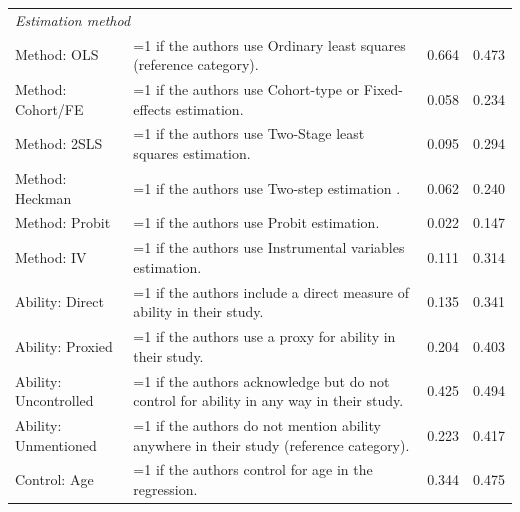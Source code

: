 \begin{singlespace}
\begin{scriptsize}
\begin{longtable}{
@{\hskip\tabcolsep\extracolsep\fill}
l
p{0.55\hsize}
cc
@{}
}
\multicolumn{4}{l}{\emph{Estimation method}}\\    
            Method: OLS &                                                                                                            =1 if the authors use Ordinary least squares (reference category). &    0.664 &  0.473 \\
      Method: Cohort/FE &                                                                                           =1 if the authors use Cohort-type or Fixed-effects estimation. &    0.058 &  0.234 \\
           Method: 2SLS &                                                                                                =1 if the authors use Two-Stage least squares estimation. &    0.095 &  0.294 \\
        Method: Heckman &                                                                                  =1 if the authors use Two-step estimation \citep{heckman1974empirical}. &    0.062 &  0.240 \\
         Method: Probit &                                                                                                                 =1 if the authors use Probit estimation. &    0.022 &  0.147 \\
             Method: IV &                                                                            =1 if the authors use Instrumental variables estimation. &    0.111 &  0.314 \\
        Ability: Direct &                                                                                    =1 if the authors include a direct measure of ability in their study. &    0.135 &  0.341 \\
       Ability: Proxied &                                                                                                =1 if the authors use a proxy for ability in their study. &    0.204 &  0.403 \\
  Ability: Uncontrolled &                                                                 =1 if the authors acknowledge but do not control for ability in any way in their study. &    0.425 &  0.494 \\
   Ability: Unmentioned &                                                                   =1 if the authors do not mention ability anywhere in their study (reference category). &    0.223 &  0.417 \\
           Control: Age &                                                                                                     =1 if the authors control for age in the regression. &    0.344 &  0.475 \\

\end{longtable}
\end{scriptsize}
\end{singlespace}
